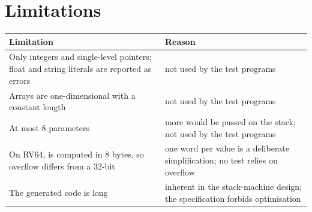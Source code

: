 \documentclass[12pt]{article}
\begin{document}
\section{Limitations}

\begin{center}
\begin{tabularx}{\linewidth}{@{}LL@{}}
\toprule
Limitation & Reason \\
\midrule
Only integers and single-level pointers; float and string literals are reported as errors & not used by the test programs \\
Arrays are one-dimensional with a constant length & not used by the test programs \\
At most 8 parameters & more would be passed on the stack; not used by the test programs \\
On RV64,  is computed in 8 bytes, so overflow differs from a 32-bit  & one word per value is a deliberate simplification; no test relies on overflow \\
The generated code is long & inherent in the stack-machine design; the specification forbids optimisation \\
\bottomrule
\end{tabularx}
\end{center}
\end{document}
